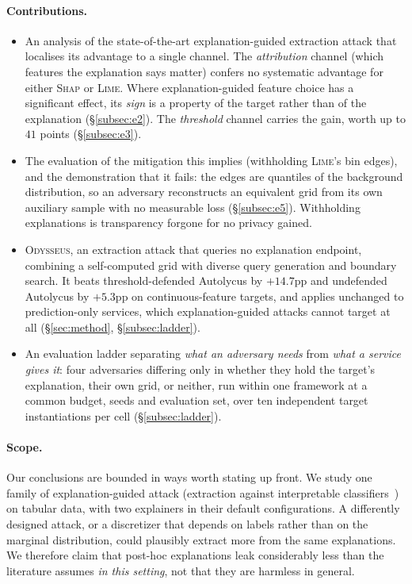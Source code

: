 \documentclass[sigconf,anonymous,review]{acmart}
\newcommand{\sys}{\textsc{Odysseus}}
\begin{document}
\paragraph{Contributions.}
\begin{itemize}
  \item An analysis of the state-of-the-art explanation-guided extraction attack that localises its
  advantage to a single channel. The \emph{attribution} channel (which features the explanation says matter) confers no systematic advantage for either \textsc{Shap} or \textsc{Lime}. Where explanation-guided feature choice has a significant effect, its \emph{sign} is a property of the
  target rather than of the explanation (\S\ref{subsec:e2}). The \emph{threshold} channel carries the
  gain, worth up to $41$ points (\S\ref{subsec:e3}).
  \item The evaluation of the mitigation this implies (withholding \textsc{Lime}'s bin edges), and the demonstration that it fails: the edges are quantiles of the background distribution, so an
  adversary reconstructs an equivalent grid from its own auxiliary sample with no measurable loss
  (\S\ref{subsec:e5}). Withholding explanations is transparency forgone for no privacy gained.
  \item \sys, an extraction attack that queries no explanation endpoint, combining a self-computed
  grid with diverse query generation and boundary search. It beats threshold-defended Autolycus by
  $+14.7$pp and undefended Autolycus by $+5.3$pp on continuous-feature targets, and applies unchanged
  to prediction-only services, which explanation-guided attacks cannot target at all
  (\S\ref{sec:method}, \S\ref{subsec:ladder}).
  \item An evaluation ladder separating \emph{what an adversary needs} from \emph{what a service gives
  it}: four adversaries differing only in whether they hold the target's explanation, their own grid,
  or neither, run within one framework at a common budget, seeds and evaluation set, over ten
  independent target instantiations per cell (\S\ref{subsec:ladder}).
\end{itemize}

\paragraph{Scope.} Our conclusions are bounded in ways worth stating up front. We study one family of explanation-guided attack (extraction against interpretable
classifiers~\cite{oksuz2024autolycus}) on tabular data, with two explainers in their default
configurations. A differently designed attack, or a discretizer that depends on labels rather than on
the marginal distribution, could plausibly extract more from the same explanations. We therefore claim
that post-hoc explanations leak considerably less than the literature assumes \emph{in this setting},
not that they are harmless in general.
\end{document}
